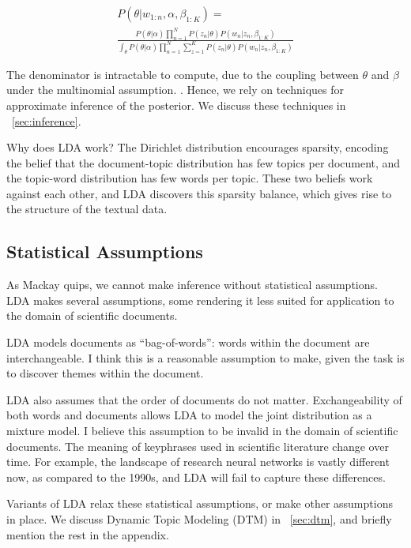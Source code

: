 \documentclass[letterpaper]{article}
\begin{document}
\begin{multline}
  P(\theta | w_{1:n}, \alpha, \beta_{1:K}) = \\ \frac{P(\theta |
    \alpha)\prod_{n=1}^{N} P(z_n | \theta) P(w_n | z_n,
    \beta_{1:K})}{\int_\theta P(\theta | \alpha) \prod_{n=1}^N
    \sum_{z=1}^K P(z_n | \theta) P(w_n | z_n, \beta_{1:K})}
\end{multline}


The denominator is intractable to compute, due to the coupling
between $\theta$ and $\beta$ under the multinomial assumption.
\cite{blei2003latent}. Hence, we rely on techniques for approximate
inference of the posterior. We discuss these techniques in
~\autoref{sec:inference}.

Why does LDA work? The Dirichlet distribution encourages sparsity,
encoding the belief that the document-topic distribution has few
topics per document, and the topic-word distribution has few words per
topic. These two beliefs work against each other, and LDA discovers
this sparsity balance, which gives rise to the structure of the
textual data.

\subsection{Statistical Assumptions}
\label{subsec:statistical-assumptions}
As Mackay quips, we cannot make inference without statistical
assumptions. LDA makes several assumptions, some rendering it less
suited for application to the domain of scientific documents.

LDA models documents as ``bag-of-words'': words within the document
are interchangeable. \cite{blei2003latent} I think this is a
reasonable assumption to make, given the task is to discover themes
within the document.

LDA also assumes that the order of documents do not matter.
Exchangeability of both words and documents allows LDA to model the
joint distribution as a mixture model. I believe this assumption to be
invalid in the domain of scientific documents. The meaning of
keyphrases used in scientific literature change over time. For
example, the landscape of research neural networks is vastly different
now, as compared to the 1990s, and LDA will fail to capture these
differences.

Variants of LDA relax these statistical assumptions, or make other
assumptions in place. We discuss Dynamic Topic Modeling (DTM) in
~\autoref{sec:dtm}, and briefly mention the rest in the appendix.
\end{document}
